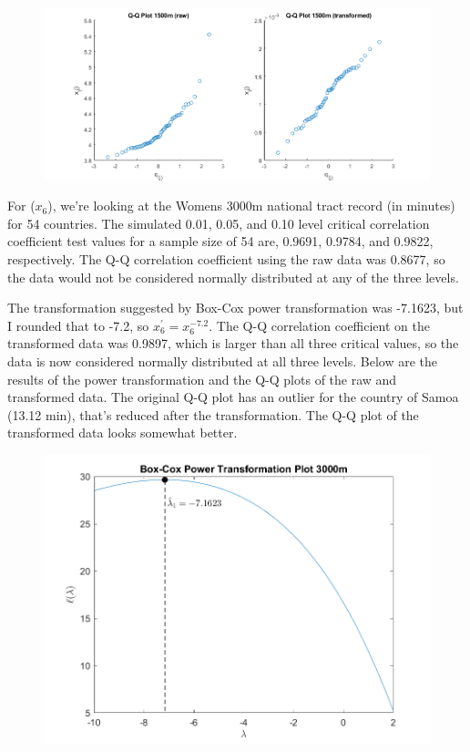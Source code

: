 \begin{center}
    \begin{figure}[H]
        \centering
        \includegraphics[scale=0.4]{./matlab/chapter-4/sol4.36.qq.5.png}
    \end{figure}
\end{center}

For ($x_{6}$), we're looking at the Womens 3000m national tract record (in minutes) for 54 countries. The simulated 0.01, 0.05, and 0.10 level critical correlation coefficient test values for a sample size of 54 are, 0.9691, 0.9784, and 0.9822, respectively. The Q-Q correlation coefficient using the raw data was 0.8677, so the data would not be considered normally distributed at any of the three levels.

The transformation suggested by Box-Cox power transformation was -7.1623, but I rounded that to -7.2, so $x_{6}^{\prime} = x_{6}^{-7.2}$.
The Q-Q correlation coefficient on the transformed data was 0.9897, which is larger than all three critical values, so the data is now considered normally distributed at all three levels.
Below are the results of the power transformation and the Q-Q plots of the raw and transformed data.
The original Q-Q plot has an outlier for the country of Samoa (13.12 min), that's reduced after the transformation. The Q-Q plot of the transformed data looks somewhat better.

\begin{center}
    \begin{figure}[H]
        \centering
        \includegraphics[scale=0.6]{./matlab/chapter-4/sol4.36.power.6.png}
    \end{figure}
\end{center}


